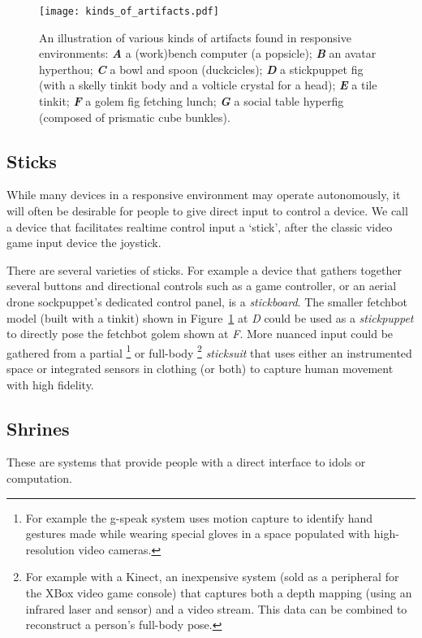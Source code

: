 \begin{figure}[]
  \centering
    \texttt{[image: kinds\_of\_artifacts.pdf]}
  \caption{An illustration of various kinds of artifacts found in responsive environments: \textbf{\emph{A}} a (work)bench computer (a popsicle); \textbf{\emph{B}} an avatar hyperthou; \textbf{\emph{C}} a bowl and spoon (duckcicles); \textbf{\emph{D}} a stickpuppet fig (with a skelly tinkit body and a volticle crystal for a head); \textbf{\emph{E}} a tile tinkit; \textbf{\emph{F}} a golem fig fetching lunch; \textbf{\emph{G}} a social table hyperfig (composed of prismatic cube bunkles).}
  \label{fig:kinds_of_artifacts}
\end{figure}

\subsection{Sticks}
%
While many devices in a responsive environment may operate autonomously, it will often be desirable for people to give direct input to control a device. 
We call a device that facilitates realtime control input a `stick', after the classic video game input device the joystick. 

There are several varieties of sticks. 
For example a device that gathers together several buttons and directional controls such as a game controller, or an aerial drone sockpuppet's dedicated control panel, is a \emph{stickboard}. 
The smaller fetchbot model (built with a tinkit) shown in Figure~\ref{fig:kinds_of_artifacts} at \emph{D} could be used as a \emph{stickpuppet} to directly pose the fetchbot golem shown at \emph{F}. 
More nuanced input could be gathered from a partial%
\footnote{For example the g-speak system \citep{gstalt} uses motion capture to identify hand gestures made while wearing special gloves in a space populated with high-resolution video cameras.}
or full-body%
\footnote{For example with a Kinect, an inexpensive system (sold as a peripheral for the XBox video game console) that captures both a depth mapping (using an infrared laser and sensor) and a video stream. This data can be combined to reconstruct a person's full-body pose.}
\emph{sticksuit} that uses either an instrumented space or integrated sensors in clothing (or both) to capture human movement with high fidelity.

\subsection{Shrines}
%
These are systems that provide people with a direct interface to idols or computation.

